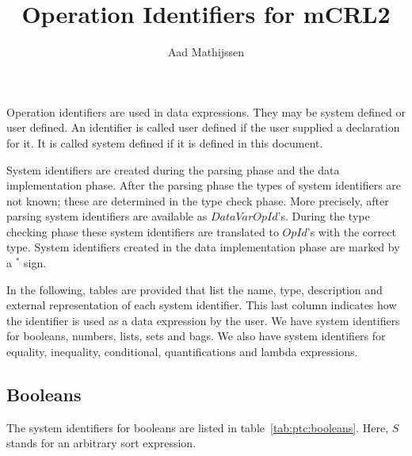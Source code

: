 \documentclass[a4paper,fleqn]{article}
\title{Operation Identifiers for mCRL2}
\author{Aad Mathijssen}
\newcommand{\frm}[1]{\mbox{\ensuremath{#1}}}
\newcommand{\f}[1]{\ensuremath{\mathit{#1}}}
\begin{document}
\maketitle

\noindent
Operation identifiers are used in data expressions. They may be system defined
or user defined. An identifier is called user defined if the user supplied a
declaration for it. It is called system defined if it is defined in this
document.

System identifiers are created during the parsing phase and the data
implementation phase. After the parsing phase the types of system identifiers
are not known; these are determined in the type check phase. More precisely,
after parsing system identifiers are available as \f{DataVarOpId}'s. During the
type checking phase these system identifiers are translated to \f{OpId}'s with
the correct type. System identifiers created in the data implementation phase
are marked by a \frm{^*} sign.

In the following, tables are provided that list the name, type, description and
external representation of each system identifier. This last column indicates
how the identifier is used as a data expression by the user. We have system
identifiers for booleans, numbers, lists, sets and bags. We also have system
identifiers for equality, inequality, conditional, quantifications and lambda
expressions.

\subsection*{Booleans}

The system identifiers for booleans are listed in table~\ref{tab:ptc:booleans}.
Here, \frm{S} stands for an arbitrary sort expression.
\end{document}
